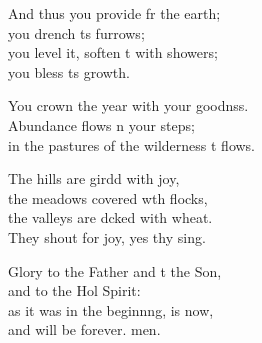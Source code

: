 \begin{psalmverse}
\begin{patverse}
And thus you provide fr the earth;\Med\\
you drench \pointup{\i}ts furrows;\\
you level it, soften \pointup{\i}t with showers;\Med\\
you bless \pointup{\i}ts growth.

You crown the year with your goodnss.\Flex\\
Abundance flows \pointup{\i}n your steps;\Med\\
in the pastures of the wilderness \pointup{\i}t flows.

The hills are girdd with joy,\Med\\
the meadows covered w\pointup{\i}th flocks,\\
the valleys are dcked with wheat.\Med\\
They shout for joy, yes thy sing.

Glory to the Father and t the Son,\Med\\
and to the Hol Spirit:\\
as it was in the beginn\pointup{\i}ng, is now,\Med\\
and will be forever. men. 
  \end{patverse}
\end{psalmverse}
